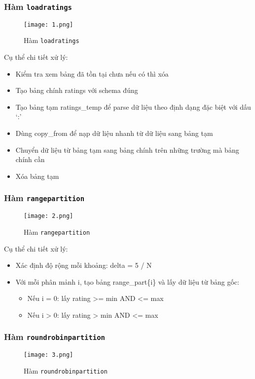 \documentclass[14pt]{extarticle}
\begin{document}
\subsubsection{Hàm \texttt{loadratings}}
\begin{figure}[H]
    \centering
    \texttt{[image: 1.png]}
    \caption{Hàm \texttt{loadratings}}

\end{figure}
Cụ thể chi tiết xử lý:
\begin{itemize}
    \item Kiểm tra xem bảng đã tồn tại chưa nếu có thì xóa
    \item Tạo bảng chính ratings với schema đúng
    \item Tạo bảng tạm ratings\_temp để parse dữ liệu theo định dạng đặc biệt với dấu ‘:’
    \item Dùng copy\_from để nạp dữ liệu nhanh từ dữ liệu sang bảng tạm
    \item Chuyển dữ liệu từ bảng tạm sang bảng chính trên những trường mà bảng chính cần
    \item Xóa bảng tạm
\end{itemize}

\subsubsection{Hàm \texttt{rangepartition}}
\begin{figure}[H]
    \centering
    \texttt{[image: 2.png]}
    \caption{Hàm \texttt{rangepartition}}
    
\end{figure}

Cụ thể chi tiết xử lý:
\begin{itemize}
    \item Xác định độ rộng mỗi khoảng: delta = 5 / N
    \item Với mỗi phân mảnh i, tạo bảng range\_part\{i\} và lấy dữ liệu từ bảng gốc:
    \begin{itemize}
        \item Nếu i = 0: lấy rating >= min AND <= max
        \item Nếu i > 0: lấy rating > min AND <= max
    \end{itemize}
\end{itemize}

\subsubsection{Hàm \texttt{roundrobinpartition}}
\begin{figure}[H]
    \centering
    \texttt{[image: 3.png]}
    \caption{Hàm \texttt{roundrobinpartition}}

\end{figure}
\end{document}
